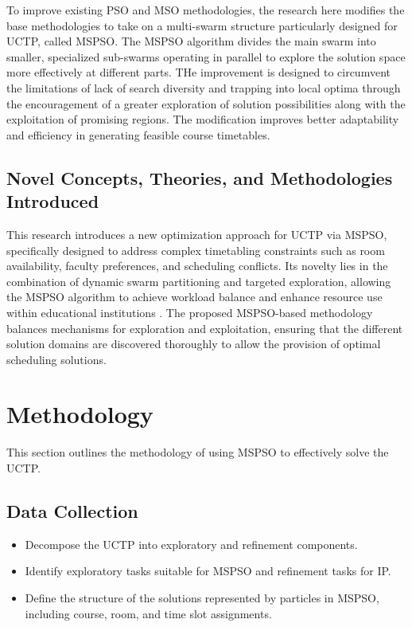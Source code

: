 \documentclass{article}
\begin{document}
To improve existing PSO and MSO methodologies, the research here modifies the base methodologies to take on a multi-swarm structure particularly designed for UCTP, called MSPSO. The MSPSO algorithm divides the main swarm into smaller, specialized sub-swarms operating in parallel to explore the solution space more effectively at different parts. \cite{XIA2018126} \cite{blackwell2004multi} THe improvement is designed to circumvent the limitations of lack of search diversity and trapping into local optima through the encouragement of a greater exploration of solution possibilities along with the exploitation of promising regions. The modification improves better adaptability and efficiency in generating feasible course timetables.

\subsection{Novel Concepts, Theories, and Methodologies Introduced}

This research introduces a new optimization approach for UCTP via MSPSO, specifically designed to address complex timetabling constraints such as room availability, faculty preferences, and scheduling conflicts. Its novelty lies in the combination of dynamic swarm partitioning and targeted exploration, allowing the MSPSO algorithm to achieve workload balance and enhance resource use within educational institutions \cite{Bacanin2022-multiswarm}. The proposed MSPSO-based methodology balances mechanisms for exploration and exploitation, ensuring that the different solution domains are discovered thoroughly to allow the provision of optimal scheduling solutions.

\section{Methodology}
\label{sec
}

This section outlines the methodology of using MSPSO to effectively solve the UCTP.

\subsection{Data Collection}
\label{subsec} 
\begin{itemize} \item Decompose the UCTP into exploratory and refinement components. \item Identify exploratory tasks suitable for MSPSO and refinement tasks for IP. \item Define the structure of the solutions represented by particles in MSPSO, including course, room, and time slot assignments. \end{itemize}
\end{document}
